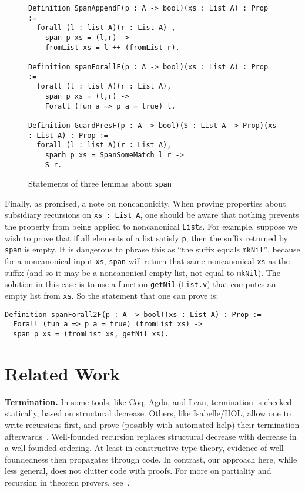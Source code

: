 \documentclass[a4paper,USenglish]{lipics-v2021}
\begin{document}
\begin{figure}
\begin{verbatim}
Definition SpanAppendF(p : A -> bool)(xs : List A) : Prop :=
  forall (l : list A)(r : List A) ,
    span p xs = (l,r) ->
    fromList xs = l ++ (fromList r).

Definition spanForallF(p : A -> bool)(xs : List A) : Prop :=
  forall (l : list A)(r : List A),
    span p xs = (l,r) ->
    Forall (fun a => p a = true) l.

Definition GuardPresF(p : A -> bool)(S : List A -> Prop)(xs : List A) : Prop :=
  forall (l : list A)(r : List A),
    spanh p xs = SpanSomeMatch l r ->
    S r.
\end{verbatim}
\caption{Statements of three lemmas about \texttt{span}}
\label{fig:spanlem}
\end{figure}

Finally, as promised, a note on noncanonicity. When proving properties about subsidiary
recursions on \verb|xs : List A|, one should be aware that nothing prevents
the property from being applied to noncanonical \verb|List|s.  For example,
suppose we wish to prove that if all elements of a  list satisfy \verb|p|, then
the suffix returned by \verb|span| is empty.  It is dangerous to phrase
this as ``the suffix equals \verb|mkNil|'', because for a noncanonical input \verb|xs|,
\verb|span| will return that same  noncanonical \verb|xs| as the suffix (and so
it may be a noncanonical empty list, not equal to \verb|mkNil|).  The solution
in this case is to use a function \verb|getNil| (\verb|List.v|) that computes
an empty list from \verb|xs|.  So the statement that one can prove is:

\begin{verbatim}
Definition spanForall2F(p : A -> bool)(xs : List A) : Prop :=
  Forall (fun a => p a = true) (fromList xs) ->
  span p xs = (fromList xs, getNil xs).
\end{verbatim}

\section{Related Work}
\label{sec:related}

\textbf{Termination.}  In some tools, like Coq, Agda, and Lean,
termination is checked statically, based on structural decrease.
Others, like Isabelle/HOL, allow one to write recursions first, and
prove (possibly with automated help) their termination
afterwards~\cite{krauss}.  Well-founded recursion replaces structural
decrease with decrease in a well-founded ordering. At least in
constructive type theory, evidence of well-foundedness then propagates
through code.  In contrast, our approach here, while less general,
does not clutter code with proofs.  For more on partiality and recursion
in theorem provers, see~\cite{bove+16}.
\end{document}
